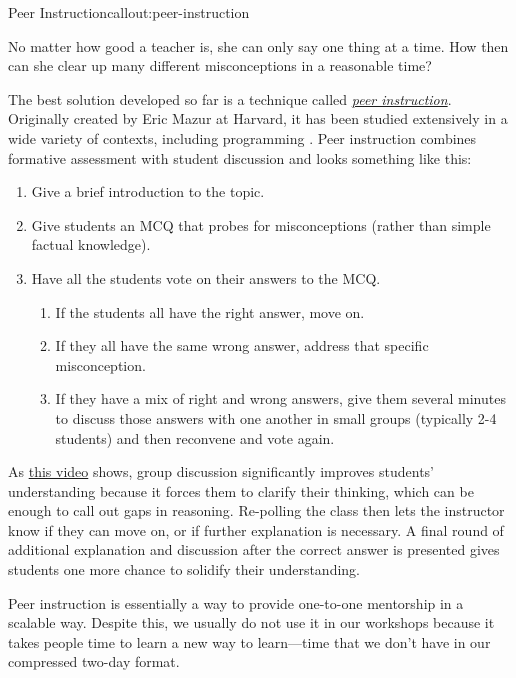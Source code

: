 \begin{callout}{Peer Instruction}{callout:peer-instruction}

No matter how good a teacher is, she can only say one thing at a time.
How then can she clear up many different misconceptions in a reasonable
time?

The best solution developed so far is a technique called
\emph{\href{https://en.wikipedia.org/wiki/Peer\_instruction}{peer
instruction}}. Originally created by Eric Mazur at Harvard, it has
been studied extensively in a wide variety of contexts, including
programming \cite{fixme}. Peer instruction combines formative
assessment with student discussion and looks something like this:

\begin{enumerate}

\item
  Give a brief introduction to the topic.

\item
  Give students an MCQ that probes for misconceptions (rather than
  simple factual knowledge).

\item
  Have all the students vote on their answers to the MCQ.

  \begin{enumerate}

  \item
    If the students all have the right answer, move on.

  \item
    If they all have the same wrong answer, address that specific
    misconception.

  \item
    If they have a mix of right and wrong answers, give them several
    minutes to discuss those answers with one another in small groups
    (typically 2-4 students) and then reconvene and vote again.

  \end{enumerate}

\end{enumerate}

As \href{https://www.youtube.com/watch?t=1\&v=2LbuoxAy56o}{this video}
shows, group discussion significantly improves students' understanding
because it forces them to clarify their thinking, which can be enough to
call out gaps in reasoning. Re-polling the class then lets the
instructor know if they can move on, or if further explanation is
necessary. A final round of additional explanation and discussion after
the correct answer is presented gives students one more chance to
solidify their understanding.

Peer instruction is essentially a way to provide one-to-one mentorship
in a scalable way. Despite this, we usually do not use it in our
workshops because it takes people time to learn a new way to
learn---time that we don't have in our compressed two-day format.

\end{callout}

